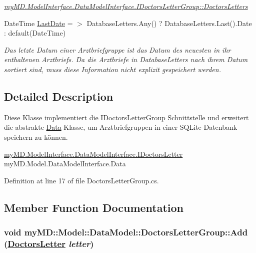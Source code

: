 \begin{CompactItemize}
\begin{CompactList}\small\item\em \hyperlink{interfacemy_m_d_1_1_model_interface_1_1_data_model_interface_1_1_i_doctors_letter_group_54718291c29adece386cab47aaf27f45}{my\-MD.Model\-Interface.Data\-Model\-Interface.IDoctors\-Letter\-Group::Doctors\-Letters} \item\end{CompactList}\item 
Date\-Time \hyperlink{classmy_m_d_1_1_model_1_1_data_model_1_1_doctors_letter_group_60f35d38f828e2c77f5243ebabc0e64b}{Last\-Date} = $>$ Database\-Letters.Any() ? Database\-Letters.Last().Date : default(Date\-Time)
\begin{CompactList}\small\item\em Das letzte Datum einer Arztbriefgruppe ist das Datum des neuesten in ihr enthaltenen Arztbriefs. Da die Arztbriefe in Database\-Letters nach ihrem Datum sortiert sind, muss diese Information nicht explizit gespeichert werden. \item\end{CompactList}\end{CompactItemize}


\subsection{Detailed Description}
Diese Klasse implementiert die IDoctors\-Letter\-Group Schnittstelle und erweitert die abstrakte \hyperlink{classmy_m_d_1_1_model_1_1_data_model_1_1_data}{Data} Klasse, um Arztbriefgruppen in einer SQLite-Datenbank speichern zu k\"{o}nnen. 

\hyperlink{interfacemy_m_d_1_1_model_interface_1_1_data_model_interface_1_1_i_doctors_letter}{my\-MD.Model\-Interface.Data\-Model\-Interface.IDoctors\-Letter} my\-MD.Model.Data\-Model\-Interface.Data 



Definition at line 17 of file Doctors\-Letter\-Group.cs.

\subsection{Member Function Documentation}
\hypertarget{classmy_m_d_1_1_model_1_1_data_model_1_1_doctors_letter_group_6de945f2b75d0439ee78a7a0aa5f3856}{
\subsubsection[Add]{\setlength{\rightskip}{0pt plus 5cm}void my\-MD::Model::Data\-Model::Doctors\-Letter\-Group::Add (\hyperlink{classmy_m_d_1_1_model_1_1_data_model_1_1_doctors_letter}{Doctors\-Letter} {\em letter})}}
\label{db/dfe/classmy_m_d_1_1_model_1_1_data_model_1_1_doctors_letter_group_6de945f2b75d0439ee78a7a0aa5f3856}


